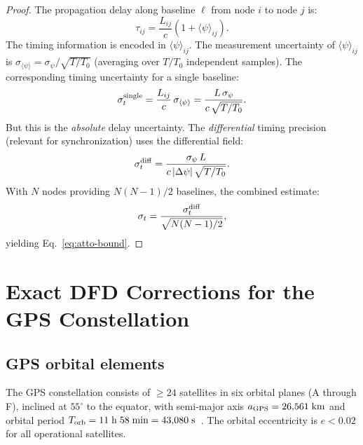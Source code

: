 \documentclass[aps,prd,twocolumn,superscriptaddress,nofootinbib,longbibliography]{revtex4-2}
\begin{document}
\begin{proof}
The propagation delay along baseline $\ell$ from node $i$ to node $j$ is:
\begin{equation}
\tau_{ij} = \frac{L_{ij}}{c}\left(1 + \langle\psi\rangle_{ij}\right).
\end{equation}
The timing information is encoded in $\langle\psi\rangle_{ij}$. The
measurement uncertainty of $\langle\psi\rangle_{ij}$ is
$\sigma_{\langle\psi\rangle} = \sigma_\psi/\sqrt{T/T_0}$ (averaging
over $T/T_0$ independent samples). The corresponding timing uncertainty
for a single baseline:
\begin{equation}
\sigma_t^{\rm single} = \frac{L_{ij}}{c}\,\sigma_{\langle\psi\rangle}
= \frac{L\,\sigma_\psi}{c\,\sqrt{T/T_0}}.
\end{equation}
But this is the \emph{absolute} delay uncertainty. The \emph{differential}
timing precision (relevant for synchronization) uses the
differential field:
\begin{equation}
\sigma_t^{\rm diff} = \frac{\sigma_\psi\,L}{c\,|\Delta\psi|\,\sqrt{T/T_0}}.
\end{equation}
With $N$ nodes providing $N(N-1)/2$ baselines, the combined estimate:
\begin{equation}
\sigma_t = \frac{\sigma_t^{\rm diff}}{\sqrt{N(N-1)/2}},
\end{equation}
yielding Eq.~\eqref{eq:atto-bound}.
\end{proof}


\section{Exact DFD Corrections for the GPS Constellation}\label{sec:GPS-full}

\subsection{GPS orbital elements}\label{sec:orbital-elements}

The GPS constellation consists of $\geq 24$ satellites in six orbital
planes (A through F), inclined at $55^\circ$ to the equator, with
semi-major axis $a_{\rm GPS} = 26{,}561\;\si{km}$ and orbital period
$T_{\rm orb} = 11\;\si{h}\;58\;\si{min} = 43{,}080\;\si{s}$~\cite{GPS-SPS}.
The orbital eccentricity is $e < 0.02$ for all operational satellites.
\end{document}

